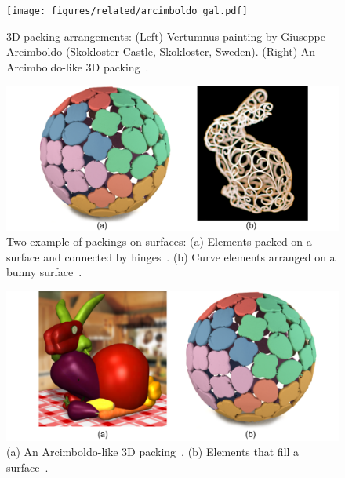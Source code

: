 \begin{figure}
\centering
\texttt{[image: figures/related/arcimboldo\_gal.pdf]} 
\caption[Examples of 3D packing arrangements]
{\label{fig_related_arcimboldo_gal} 
\newtext
{
3D packing arrangements:
(Left) Vertumnus painting by Giuseppe Arcimboldo (Skokloster Castle, Skokloster, Sweden). 
(Right) An Arcimboldo-like 3D packing~\cite{Gal2007B}.
}
}
\end{figure}

\makeatletter %
\setlength{\@fptop}{0pt} %
\makeatother %
\begin{figure}
\centering
\includegraphics[width=1.0\textwidth]{figures/related/chen_zehnder.pdf} 
\caption[Two example of packings on surfaces]
{\label{fig_related_chen_zehnder} 
\nnewtext
{
Two example of packings on surfaces:
(a) Elements packed on a surface and connected by hinges~\cite{Chen2017}.
(b) Curve elements arranged on a bunny surface~\cite{Zehnder2016}.
}
}
\end{figure}

\begin{figure}
\centering
\includegraphics[width=1.0\textwidth]{figures/related/gal_chen.pdf} 
\caption[A 3D packing and a packing on a surface]
{\label{fig_related_gal_chen} 
\newtext
{
(a) An Arcimboldo-like 3D packing~\cite{Gal2007B}. 
(b) Elements that fill a surface~\cite{Chen2017}.
}
}
\end{figure}

